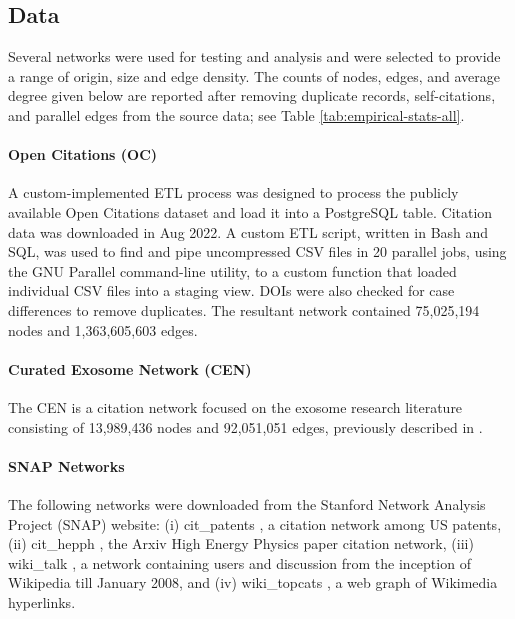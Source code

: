 \documentclass[11pt]{article}   	%
\begin{document}
 \subsection{Data} Several networks were used for testing and analysis and were selected to provide a range of origin, size and edge density. 
The counts of nodes, edges, and average degree given below are reported after removing duplicate records,
self-citations, and parallel edges from the source data; see Table \ref{tab:empirical-stats-all}.

\paragraph{Open Citations (OC)}
A custom-implemented ETL process was designed to process the publicly available Open Citations dataset \citep{Peroni2020} and load it into a PostgreSQL table. Citation data was downloaded in Aug 2022. A custom ETL script, written in Bash and SQL, was used to find and pipe uncompressed CSV files in 20 parallel jobs, using the GNU Parallel command-line utility, to a custom function that loaded individual CSV files into a staging view. DOIs were also checked for case differences to remove duplicates.  The resultant network contained 75,025,194 nodes and 1,363,605,603 edges.


\paragraph{Curated Exosome Network (CEN)}
The CEN is a citation network focused on the exosome research literature consisting of 13,989,436 nodes and 92,051,051 edges, previously described in \cite{Jakatdar_2022}.

\paragraph{SNAP Networks}The following networks were downloaded from the Stanford Network Analysis Project (SNAP) website:
 (i) cit\_patents \citep{Leskovec2005}, a citation network among US patents,
(ii) cit\_hepph \citep{Leskovec2005}, the Arxiv High Energy Physics paper citation network,
(iii) wiki\_talk \citep{Leskovec2010}, a network containing users and discussion from the inception of Wikipedia till January 2008,  and
(iv) wiki\_topcats \citep{Yin2017}, a web graph of Wikimedia hyperlinks.
\end{document}
